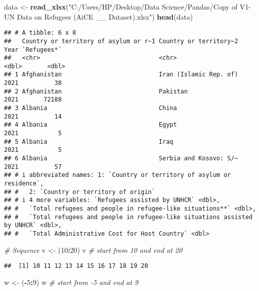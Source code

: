 \documentclass[
]{article}
\newenvironment{Shaded}{\begin{snugshade}}{\end{snugshade}}
\newcommand{\CommentTok}[1]{\textcolor[rgb]{0.56,0.35,0.01}{\textit{#1}}}
\newcommand{\DecValTok}[1]{\textcolor[rgb]{0.00,0.00,0.81}{#1}}
\newcommand{\FunctionTok}[1]{\textcolor[rgb]{0.13,0.29,0.53}{\textbf{#1}}}
\newcommand{\NormalTok}[1]{#1}
\newcommand{\OtherTok}[1]{\textcolor[rgb]{0.56,0.35,0.01}{#1}}
\newcommand{\SpecialCharTok}[1]{\textcolor[rgb]{0.81,0.36,0.00}{\textbf{#1}}}
\newcommand{\StringTok}[1]{\textcolor[rgb]{0.31,0.60,0.02}{#1}}
\begin{document}
\begin{Shaded}
\begin{Highlighting}[]
\NormalTok{data }\OtherTok{\textless{}{-}} \FunctionTok{read\_xlsx}\NormalTok{(}\StringTok{"C:/Users/HP/Desktop/Data Science/Pandas/Copy of V1{-} UN Data on Refugees (AiCE \_\_ Dataset).xlsx"}\NormalTok{)}
 \FunctionTok{head}\NormalTok{(data)}
\end{Highlighting}
\end{Shaded}

\begin{verbatim}
## # A tibble: 6 x 8
##   Country or territory of asylum or r~1 Country or territory~2  Year `Refugees*`
##   <chr>                                 <chr>                  <dbl>       <dbl>
## 1 Afghanistan                           Iran (Islamic Rep. of)  2021          38
## 2 Afghanistan                           Pakistan                2021       72188
## 3 Albania                               China                   2021          14
## 4 Albania                               Egypt                   2021           5
## 5 Albania                               Iraq                    2021           5
## 6 Albania                               Serbia and Kosovo: S/~  2021          57
## # i abbreviated names: 1: `Country or territory of asylum or residence`,
## #   2: `Country or territory of origin`
## # i 4 more variables: `Refugees assisted by UNHCR` <dbl>,
## #   `Total refugees and people in refugee-like situations**` <dbl>,
## #   `Total refugees and people in refugee-like situations assisted by UNHCR` <dbl>,
## #   `Total Administrative Cost for Host Country` <dbl>
\end{verbatim}

\begin{Shaded}
\begin{Highlighting}[]
\CommentTok{\# Sequence}
\NormalTok{v }\OtherTok{\textless{}{-}}\NormalTok{ (}\DecValTok{10}\SpecialCharTok{:}\DecValTok{20}\NormalTok{)}
\NormalTok{v }\CommentTok{\# start from 10 and end at 20}
\end{Highlighting}
\end{Shaded}

\begin{verbatim}
##  [1] 10 11 12 13 14 15 16 17 18 19 20
\end{verbatim}

\begin{Shaded}
\begin{Highlighting}[]
\NormalTok{w }\OtherTok{\textless{}{-}}\NormalTok{ (}\SpecialCharTok{{-}}\DecValTok{5}\SpecialCharTok{:}\DecValTok{9}\NormalTok{)}
\NormalTok{w }\CommentTok{\# start from {-}5 and end at 9}
\end{Highlighting}
\end{Shaded}
\end{document}
